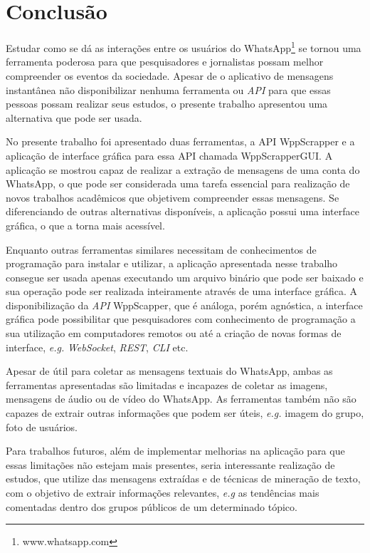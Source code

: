\chapter{Conclusão}

Estudar como se dá as interações entre os usuários do WhatsApp\footnote{www.whatsapp.com} se tornou uma ferramenta poderosa para que pesquisadores e jornalistas possam melhor compreender os eventos da sociedade. Apesar de o aplicativo de mensagens instantânea não disponibilizar nenhuma ferramenta ou \textit{API} para que essas pessoas possam realizar seus estudos, o presente trabalho apresentou uma alternativa que pode ser usada.

No presente trabalho foi apresentado duas ferramentas, a API WppScrapper e a aplicação de interface gráfica para essa API chamada WppScrapperGUI. A aplicação se mostrou capaz de realizar a extração de mensagens de uma conta do WhatsApp, o que pode ser considerada uma tarefa essencial para realização de novos trabalhos acadêmicos que objetivem compreender essas mensagens. Se diferenciando de outras alternativas disponíveis, a aplicação possui uma interface gráfica, o que a torna mais acessível. 

Enquanto outras ferramentas similares necessitam de conhecimentos de programação para instalar e utilizar, a aplicação apresentada nesse trabalho consegue ser usada apenas executando um arquivo binário que pode ser baixado e sua operação pode ser realizada inteiramente através de uma interface gráfica. A disponibilização da \textit{API} WppScapper, que é análoga, porém agnóstica, a interface gráfica pode possibilitar que pesquisadores com conhecimento de programação a sua utilização em computadores remotos ou até a criação de novas formas de interface, \textit{e.g.} \textit{WebSocket}, \textit{REST}, \textit{CLI} etc.

Apesar de útil para coletar as mensagens textuais do WhatsApp, ambas as ferramentas apresentadas são limitadas e incapazes de coletar as imagens, mensagens de áudio ou de vídeo do WhatsApp. As ferramentas também não são capazes de extrair outras informações que podem ser úteis, \textit{e.g.}  imagem do grupo, foto de usuários. 

Para trabalhos futuros, além de implementar melhorias na aplicação para que essas limitações não estejam mais presentes, seria interessante realização de estudos, que utilize das mensagens extraídas e de técnicas de mineração de texto, com o objetivo de extrair informações relevantes, \textit{e.g} as tendências mais comentadas dentro dos grupos públicos de um determinado tópico.

